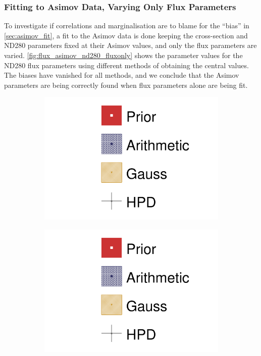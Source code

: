 \subsubsection{Fitting to Asimov Data, Varying Only Flux Parameters}
To investigate if correlations and marginalisation are to blame for the ``bias'' in \autoref{sec:asimov_fit}, a fit to the Asimov data is done keeping the cross-section and ND280 parameters fixed at their Asimov values, and only the flux parameters are varied. \autoref{fig:flux_asimov_nd280_fluxonly} shows the parameter values for the ND280 flux parameters using different methods of obtaining the central values. The biases have vanished for all methods, and we conclude that the Asimov parameters are being correctly found when flux parameters alone are being fit.

\begin{figure}[h]
	\begin{subfigure}[t]{0.2\textwidth}
		\includegraphics[width=\textwidth, trim={0mm 150mm 30mm 0mm}, clip,page=1]{figures/mach3/Asimov/2017b_Asimov_July2017_FixND280_FixXsec_0_drawPar}
	\end{subfigure}
\begin{subfigure}[t]{0.2\textwidth}
	\includegraphics[width=\textwidth, trim={0mm 100mm 30mm 50mm}, clip,page=1]{figures/mach3/Asimov/2017b_Asimov_July2017_FixND280_FixXsec_0_drawPar}

\end{subfigure}
\end{figure}

